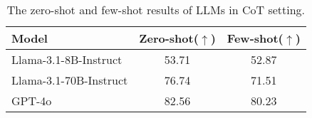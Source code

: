 \begin{table}[!htbp]
\small
\centering
\begin{tabular}{lcc}
\toprule
Model & Zero-shot($\uparrow$) & Few-shot($\uparrow$)\\ 
\midrule
Llama-3.1-8B-Instruct & 53.71  & 52.87 \\
Llama-3.1-70B-Instruct & 76.74  & 71.51 \\
GPT-4o & 82.56  & 80.23 \\
\bottomrule
\end{tabular}
\caption{The zero-shot and few-shot results of LLMs in CoT setting.}
\label{table:few-shot}
\end{table}